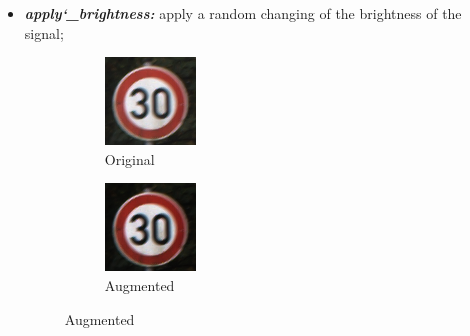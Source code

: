 \begin{itemize}
\item \textbf{\textit{apply\char`_brightness:}} apply a random changing of the brightness of the signal;
\begin{figure}[!ht]
\centering
\begin{subfigure}{.2\textwidth}
  \centering
  \includegraphics[width=.8\linewidth]{img/00001_00011_00027.png}
  \caption{Original}
  \label{fig:sub1}
\end{subfigure}%
\begin{subfigure}{.2\textwidth}
  \centering
  \includegraphics[width=.8\linewidth]{img/2.png}
  \caption{Augmented}
  \label{fig:sub2}
\end{subfigure}
\end{figure}


\end{itemize}
